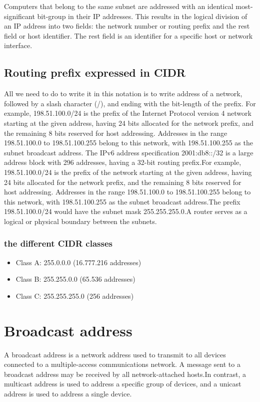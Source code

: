 \documentclass[a4paper,12pt]{book}
\begin{document}
Computers that belong to the same subnet are addressed with an identical most-significant bit-group in their IP addresses. This results in the logical division of an IP address into two fields: the network number or routing prefix and the rest field or host identifier. The rest field is an identifier for a specific host or network interface.

\subsection{Routing prefix expressed in CIDR}
All we need to do to write it in this notation is to write address of a network, followed by a slash character (/), and ending with the bit-length of the prefix. For example, 198.51.100.0/24 is the prefix of the Internet Protocol version 4 network starting at the given address, having 24 bits allocated for the network prefix, and the remaining 8 bits reserved for host addressing. Addresses in the range 198.51.100.0 to 198.51.100.255 belong to this network, with 198.51.100.255 as the subnet broadcast address. The IPv6 address specification 2001:db8::/32 is a large address block with 296 addresses, having a 32-bit routing prefix.For example, 198.51.100.0/24 is the prefix of the network starting at the given address, having 24 bits allocated for the network prefix, and the remaining 8 bits reserved for host addressing. Addresses in the range 198.51.100.0 to 198.51.100.255 belong to this network, with 198.51.100.255 as the subnet broadcast address.The prefix 198.51.100.0/24 would have the subnet mask 255.255.255.0.A router serves as a logical or physical boundary between the subnets.


\subsubsection{the different CIDR classes}
\begin{itemize}
\item{Class A: 255.0.0.0 (16.777.216 addresses)​}
\item{Class B: 255.255.0.0 (65.536 addresses)​}
\item{Class C: 255.255.255.0 (256 addresses)​}
\end{itemize}

\section{Broadcast address}
A broadcast address is a network address used to transmit to all devices connected to a multiple-access communications network. A message sent to a broadcast address may be received by all network-attached hosts.In contrast, a multicast address is used to address a specific group of devices, and a unicast address is used to address a single device. 
\end{document}
